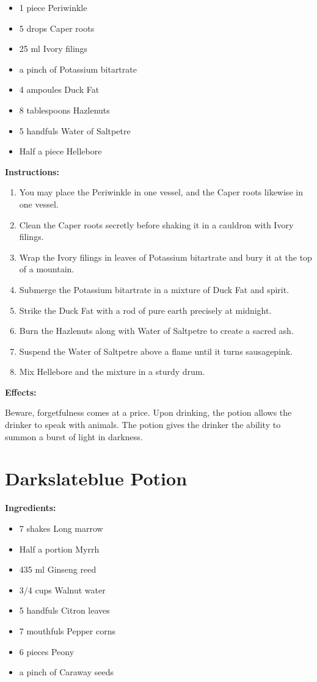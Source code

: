 \documentclass{article}
\begin{document}
\begin{itemize}
  \item 1 piece Periwinkle
  \item 5 drops Caper roots
  \item 25 ml Ivory filings
  \item a pinch of Potassium bitartrate
  \item 4 ampoules Duck Fat
  \item 8 tablespoons Hazlenuts
  \item 5 handfuls Water of Saltpetre
  \item Half a piece Hellebore
\end{itemize}

\textbf{Instructions:}

\begin{enumerate}
  \item You may place the Periwinkle in one vessel, and the Caper roots likewise in one vessel.
  \item Clean the Caper roots secretly before shaking it in a cauldron with Ivory filings.
  \item Wrap the Ivory filings in leaves of Potassium bitartrate and bury it at the top of a mountain.
  \item Submerge the Potassium bitartrate in a mixture of Duck Fat and spirit.
  \item Strike the Duck Fat with a rod of pure earth precisely at midnight.
  \item Burn the Hazlenuts along with Water of Saltpetre to create a sacred ash.
  \item Suspend the Water of Saltpetre above a flame until it turns sausagepink.
  \item Mix Hellebore and the mixture in a sturdy drum.
\end{enumerate}

\textbf{Effects:}

Beware, forgetfulness comes at a price. Upon drinking, the potion allows the drinker to speak with animals. The potion gives the drinker the ability to summon a burst of light in darkness.

\newpage
\section*{Darkslateblue Potion}

\textbf{Ingredients:}

\begin{itemize}
  \item 7 shakes Long marrow
  \item Half a portion Myrrh
  \item 435 ml Ginseng reed
  \item 3/4 cups Walnut water
  \item 5 handfuls Citron leaves
  \item 7 mouthfuls Pepper corns
  \item 6 pieces Peony
  \item a pinch of Caraway seeds
\end{itemize}
\end{document}
